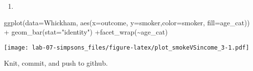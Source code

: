 \documentclass[
]{article}
\newenvironment{Shaded}{\begin{snugshade}}{\end{snugshade}}
\newcommand{\AttributeTok}[1]{\textcolor[rgb]{0.77,0.63,0.00}{#1}}
\newcommand{\FunctionTok}[1]{\textcolor[rgb]{0.00,0.00,0.00}{#1}}
\newcommand{\NormalTok}[1]{#1}
\newcommand{\SpecialCharTok}[1]{\textcolor[rgb]{0.00,0.00,0.00}{#1}}
\newcommand{\StringTok}[1]{\textcolor[rgb]{0.31,0.60,0.02}{#1}}
\providecommand{\tightlist}{%
  \setlength{\itemsep}{0pt}\setlength{\parskip}{0pt}}
\begin{document}
\begin{enumerate}
\def\labelenumi{\arabic{enumi}.}
\setcounter{enumi}{6}
\tightlist
\item
\end{enumerate}

\begin{Shaded}
\begin{Highlighting}[]
\FunctionTok{ggplot}\NormalTok{(}\AttributeTok{data=}\NormalTok{Whickham, }\FunctionTok{aes}\NormalTok{(}\AttributeTok{x=}\NormalTok{outcome, }\AttributeTok{y=}\NormalTok{smoker,}\AttributeTok{color=}\NormalTok{smoker, }\AttributeTok{fill=}\NormalTok{age\_cat)) }\SpecialCharTok{+} \FunctionTok{geom\_bar}\NormalTok{(}\AttributeTok{stat=}\StringTok{"identity"}\NormalTok{) }\SpecialCharTok{+}\FunctionTok{facet\_wrap}\NormalTok{(}\SpecialCharTok{\textasciitilde{}}\NormalTok{age\_cat)}
\end{Highlighting}
\end{Shaded}

\texttt{[image: lab-07-simpsons\_files/figure-latex/plot\_smokeVSincome\_3-1.pdf]}

Knit, commit, and push to github.
\end{document}

